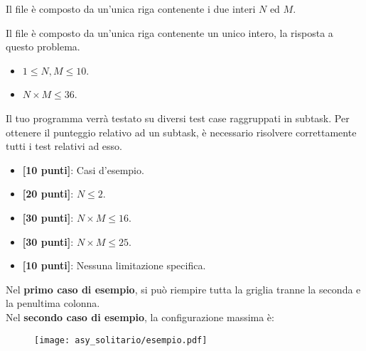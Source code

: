 \InputFile
Il file  è composto da un'unica riga contenente i due interi $N$ ed $M$.

\OutputFile
Il file \outputfile{} è composto da un'unica riga contenente un unico intero, la risposta a questo problema.

\Constraints
\begin{itemize}[nolistsep, itemsep=2mm]
	\item $1 \le N, M \le 10$.
	\item $N \times M \le 36$.
\end{itemize}

\pagebreak
\Scoring
Il tuo programma verrà testato su diversi test case raggruppati in subtask.
Per ottenere il punteggio relativo ad un subtask, è necessario risolvere
correttamente tutti i test relativi ad esso.

\begin{itemize}[nolistsep,itemsep=2mm]
  \item \textbf{ [10 punti]}: Casi d'esempio.
  \item \textbf{ [20 punti]}: $N \leq 2$.
  \item \textbf{ [30 punti]}: $N \times M \le 16$.
  \item \textbf{ [30 punti]}: $N \times M \le 25$.
  \item \textbf{ [10 punti]}: Nessuna limitazione specifica.
\end{itemize}

\Examples
\begin{example}
%
\end{example}
\begin{example}
%
\end{example}

\Explanation
Nel \textbf{primo caso di esempio}, si può riempire tutta la griglia tranne la seconda e la penultima colonna.\\[2mm]
Nel \textbf{secondo caso di esempio}, la configurazione massima è:
\begin{figure}[h]
	\centering\texttt{[image: asy\_solitario/esempio.pdf]}
\end{figure}
